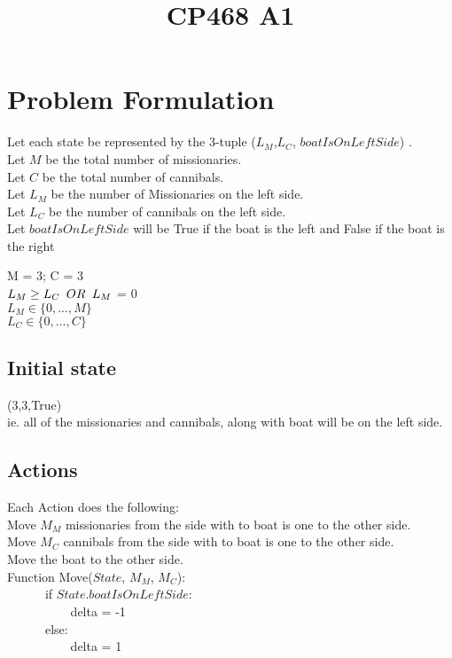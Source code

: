 \documentclass{article}
\title{CP468 A1}
\author{Group #3\\ Max Niebergall 160623100,\\ Sriram Vasuthevan 170408710,\\ Justin Harrott 161449800,\\ Rasha Nasri 164161160}
\begin{document}
\maketitle
\newpage

\section{Problem Formulation}

Let each state be represented by the 3-tuple  ($L_M$,$L_C$, $boatIsOnLeftSide$) . \\

\noindent 
Let $M$ be the total number of missionaries.\\
Let $C$ be the total number of cannibals.\\
Let $L_M$ be the number of Missionaries on the left side.\\
Let $L_C$ be the number of cannibals on the left side.\\
Let $boatIsOnLeftSide$ will be True if the boat is the left and False if the boat is the right

\hfill \break
\noindent
M = 3; C = 3\\
$L_M\geq L_C \verb| | OR \verb| | L_M$ = 0\\
$L_M \in \{0, ..., M\}$\\
$L_C \in \{0, ..., C\}$\\

\subsection{Initial state}
    (3,3,True) \\
    ie. all of the missionaries and cannibals, along with boat will be on the left side.
    
\subsection{Actions}
\hfill \break
\noindent
Each Action does the following:\\
Move $M_M$ missionaries from the side with to boat is one to the other side.\\
Move $M_C$ cannibals from the side with to boat is one to the other side.\\
Move the  boat to the other side.\\
    
Function Move($State$, $M_M$, $M_C$):\\
\verb|      |if $State.boatIsOnLeftSide$:\\
\verb|          |delta = -1\\
\verb|      |else:\\
\verb|          |delta = 1\\
\end{document}
